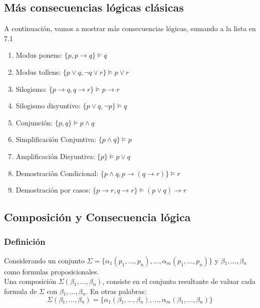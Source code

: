 \documentclass[../main.tex]{subfiles}
\begin{document}
\subsection{Más consecuencias lógicas clásicas}
A continuación, vamos a mostrar más consecuencias lógicas, sumando a la lista en 7.1
\begin{enumerate}
    \item Modus ponens: $ \{ p, p \rightarrow{} q \} \models{} q $
    \item Modus tollens: $\{ p \vee{} q, \neg{} q \vee{} r \} \models{} p \vee{} r$
    \item Silogismo: $\{ p \rightarrow{} q, q \rightarrow{} r \} \models{} p \rightarrow{} r$
    \item Silogismo disyuntivo: $\{ p \vee{} q, \neg{} p \} \models{} q$
    \item Conjunción: $\{ p, q \} \models{} p \wedge{} q$
    \item Simplificación Conjuntiva: $\{ p \wedge{} q \} \models p$
    \item Amplificación Disyuntiva: $ \{ p \} \models{} p \vee{} q$
    \item Demostración Condicional: $\{ p \wedge{} q, p \rightarrow{} (q \rightarrow{} r) \} \models{} r$
    \item Demostración por casos: $\{ p \rightarrow{} r, q \rightarrow{} r \} \models (p \vee{} q) \rightarrow{} r$
\end{enumerate}

\subsection{Composición y Consecuencia lógica}
\subsubsection{Definición}
Considerando un conjunto $\Sigma{} = \{ \alpha{}_{1}(p_{1}, \ldots{}, p_{n}), \ldots{}, \alpha{}_{m}(p_{1}, \ldots{}, p_{n}) \}$ y $\beta{}_{1}, \ldots{}, \beta{}_{n}$ como formulas proposicionales.\\
Una composición $\Sigma{}(\beta{}_{1}, \ldots{}, \beta{}_{n})$, consiste en el conjunto resultante de valuar cada formula de $\Sigma$ con $\beta{}_{1}, \ldots{}, \beta{}_{n}$. En otras palabras:\\
\large $$\Sigma{}(\beta{}_{1}, \ldots{}, \beta{}_{n}) = \{ \alpha{}_{1}(\beta{}_{1}, \ldots{}, \beta{}_{n}), \ldots{}, \alpha{}_{m}(\beta{}_{1}, \ldots{}, \beta{}_{n}) \}$$
\normalsize
\end{document}
